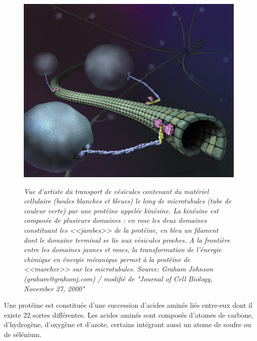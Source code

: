 \begin{figure}[h]
  \centering
  {\includegraphics[width=0.75\linewidth]{./figures/ch1/kinesincargoart}}
    \caption[Vue d'artiste du transport de vésicules le long de microtubules]{\it Vue d’artiste du transport de vésicules contenant du matériel cellulaire (boules blanches et bleues) le long de microtubules (tube de couleur verte) par une protéine appelée kinésine. La kinésine est composée de plusieurs domaines : en rose les deux domaines constituant les <<jambes>> de la protéine, en bleu un filament dont le domaine terminal se lie aux vésicules proches. A la frontière entre les domaines jaunes et roses, la transformation de l'énergie chimique en énergie mécanique permet à la protéine de <<marcher>> sur les microtubules. Source: Graham Johnson (graham@grahamj.com) / modifié de "Journal of Cell Biology, November 27, 2000"}
    \label{Fig:kinesincargoart}
  \hspace{0.2cm}
\end{figure}


Une protéine est constituée d'une succession d'acides aminés liés entre-eux dont il existe 22 sortes différentes. Les acides aminés sont composés d'atomes de carbone, d'hydrogène, d'oxygène et d'azote, certains intégrant aussi un atome de soufre ou de sélénium.


